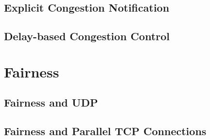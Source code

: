 \documentclass[12pt letter]{report}
\begin{document}
\subsection{Explicit Congestion Notification}

\subsection{Delay-based Congestion Control}

\section{Fairness}

\subsection{Fairness and UDP}

\subsection{Fairness and Parallel TCP Connections}
\end{document}
